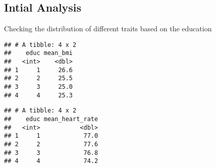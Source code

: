 \documentclass[]{article}
\newenvironment{Shaded}{\begin{snugshade}}{\end{snugshade}}
\newcommand{\KeywordTok}[1]{\textcolor[rgb]{0.13,0.29,0.53}{\textbf{#1}}}
\newcommand{\DataTypeTok}[1]{\textcolor[rgb]{0.13,0.29,0.53}{#1}}
\newcommand{\StringTok}[1]{\textcolor[rgb]{0.31,0.60,0.02}{#1}}
\newcommand{\OperatorTok}[1]{\textcolor[rgb]{0.81,0.36,0.00}{\textbf{#1}}}
\newcommand{\NormalTok}[1]{#1}
\begin{document}
\subsection{Intial Analysis}\label{intial-analysis}

Checking the distribution of different traits based on the education

\begin{Shaded}
\end{Shaded}

\begin{verbatim}
## # A tibble: 4 x 2
##    educ mean_bmi
##   <int>    <dbl>
## 1     1     26.6
## 2     2     25.5
## 3     3     25.0
## 4     4     25.3
\end{verbatim}

\begin{Shaded}
\end{Shaded}

\begin{verbatim}
## # A tibble: 4 x 2
##    educ mean_heart_rate
##   <int>           <dbl>
## 1     1            77.0
## 2     2            77.6
## 3     3            76.8
## 4     4            74.2
\end{verbatim}

\begin{Shaded}
\end{Shaded}
\end{document}
